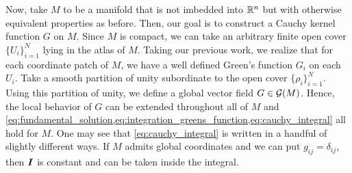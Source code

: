 Now, take $M$ to be a manifold that is not imbedded into $\mathbb{R}^n$ but with otherwise equivalent properties as before. Then, our goal is to construct a Cauchy kernel function $G$ on $M$. Since $M$ is compact, we can take an arbitrary finite open cover $\{U_i\}_{i=1}^{N}$ lying in the atlas of $M$. Taking our previous work, we realize that for each coordinate patch of $M$, we have a well defined Green's function $G_i$ on each $U_i$. Take a smooth partition of unity subordinate to the open cover $\{\rho_i\}_{i=1}^N$. Using this partition of unity, we define a global vector field $G \in \mathcal{G}(M)$. Hence, the local behavior of $G$ can be extended throughout all of $M$ and \cref{eq:fundamental_solution,eq:integration_greens_function,eq:cauchy_integral} all hold for $M$. One may see that \cref{eq:cauchy_integral} is written in a handful of slightly different ways. If $M$ admits global coordinates and we can put $g_{ij}=\delta_{ij}$, then $\boldsymbol{I}$ is constant and can be taken inside the integral.
